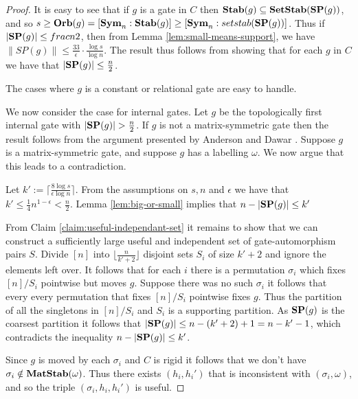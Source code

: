 \documentclass[../paper.tex]{subfiles}
\begin{document}
\begin{proof}
  It is easy to see that if $g$ is a gate in $C$ then $\text{\textbf{Stab}} (g) \subseteq
  \text{\textbf{SetStab}}(\text{\textbf{SP}}(g))$, and so $s \geq \text{\textbf{Orb}}(g) = [\text{\textbf{Sym}}_n : \text{\textbf{Stab}}(g)] \geq [\text{\textbf{Sym}}_n :
  setstab(\text{\textbf{SP}}(g))]$. Thus if $\vert \text{\textbf{SP}}(g) \vert \leq frac{n}{2}$, then from
  Lemma \ref{lem:small-means-support}, we have $\| SP (g) \| \leq
  \frac{33}{\epsilon} \cdot \frac{\log s} {\log n}$. The result thus follows
  from showing that for each $g$ in $C$ we have that $\vert \text{\textbf{SP}} (g) \vert \leq
  \frac{n}{2}$.
  
  The cases where $g$ is a constant or relational gate are easy to handle.

  We now consider the case for internal gates. Let $g$ be the topologically
  first internal gate with $\vert \text{\textbf{SP}}(g) \vert > \frac{n}{2}$. If $g$ is not a
  matrix-symmetric gate then the result follows from the argument presented by
  Anderson and Dawar \cite{AndersonD17}. Suppose $g$ is a matrix-symmetric gate,
  and suppose $g$ has a labelling $\omega$. We now argue that this leads to a
  contradiction.

  Let $k' := \lceil \frac{8 \log s}{\epsilon \log n} \rceil$. From the
  assumptions on $s, n$ and $\epsilon$ we have that $k' \leq
  \frac{1}{4}n^{1-\epsilon} < \frac{n}{2}$. Lemma \ref{lem:big-or-small} implies
  that $n - \vert \text{\textbf{SP}}(g) \vert \leq k'$
  
  From Claim \ref{claim:useful-independant-set} it remains to show that we can
  construct a sufficiently large useful and independent set of gate-automorphism
  pairs $S$. Divide $[n]$ into $\lfloor \frac{n}{k' + 2} \rfloor$ disjoint sets
  $S_i$ of size $k' + 2$ and ignore the elements left over. It follows that for
  each $i$ there is a permutation $\sigma_i$ which fixes $[n] / S_i$ pointwise
  but moves $g$. Suppose there was no such $\sigma_i$ it follows that every
  every permutation that fixes $[n]/S_i$ pointwise fixes $g$. Thus the partition
  of all the singletons in $[n]/S_i$ and $S_i$ is a supporting partition. As
  $\text{\textbf{SP}}(g)$ is the coarsest partition it follows that $\vert \text{\textbf{SP}}(g) \vert \leq n
  - (k'+2) + 1 = n - k' - 1$, which contradicts the inequality $n - \vert \text{\textbf{SP}}(g)
  \vert \leq k'$.

  Since $g$ is moved by each $\sigma_i$ and $C$ is rigid it follows that we
  don't have $\sigma_i \notin \text{\textbf{MatStab}}(\omega)$. Thus there exists $(h_i, h_i')$
  that is inconsistent with $(\sigma_i, \omega)$, and so the triple $(\sigma_i,
  h_i, h_i')$ is useful.


\end{proof}
\end{document}
